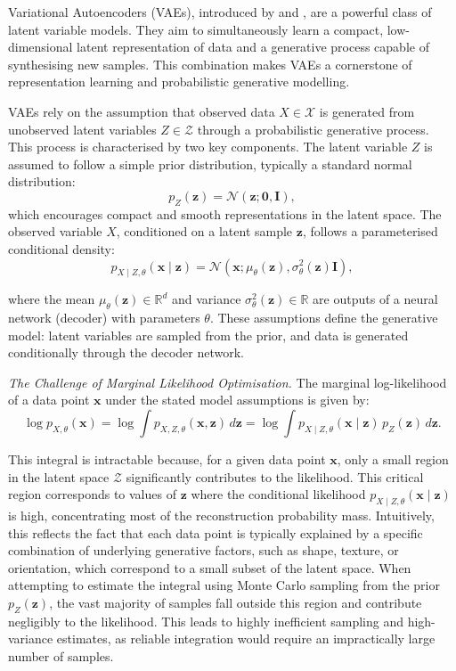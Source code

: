 Variational Autoencoders (VAEs), introduced by \citet{kingma2013auto} and \citet{rezende2014stochastic}, are a powerful class of latent variable models. They aim to simultaneously learn a compact, low-dimensional latent representation of data and a generative process capable of synthesising new samples. This combination makes VAEs a cornerstone of representation learning and probabilistic generative modelling.

VAEs rely on the assumption that observed data \(X \in \mathcal{X}\) is generated from unobserved latent variables \(Z \in \mathcal{Z}\) through a probabilistic generative process. This process is characterised by two key components. The latent variable \(Z\) is assumed to follow a simple prior distribution, typically a standard normal distribution:
\[
p_{Z}(\mathbf{z}) = \mathcal{N}(\mathbf{z}; \mathbf{0}, \mathbf{I}),
\]
which encourages compact and smooth representations in the latent space. The observed variable \(X\), conditioned on a latent sample \(\mathbf{z}\), follows a parameterised conditional density:
\begin{equation}
p_{X \mid Z, \theta}(\mathbf{x} \mid \mathbf{z}) = \mathcal{N}(\mathbf{x}; \mu_\theta(\mathbf{z}), \sigma_\theta^2(\mathbf{z}) \mathbf{I}),
\end{equation}\label{intro:eq:gaussian_reconstruction}

where the mean \(\mu_\theta(\mathbf{z}) \in \mathbb{R}^d\) and variance \(\sigma_\theta^2(\mathbf{z}) \in \mathbb{R}\) are outputs of a neural network (decoder) with parameters \(\theta\). These assumptions define the generative model: latent variables are sampled from the prior, and data is generated conditionally through the decoder network.

\textit{The Challenge of Marginal Likelihood Optimisation.}  
The marginal log-likelihood of a data point \(\mathbf{x}\) under the stated model assumptions is given by:
\[
\log p_{X, \theta}(\mathbf{x}) = \log \int p_{X, Z, \theta}(\mathbf{x}, \mathbf{z}) \, d\mathbf{z} = \log \int p_{X \mid Z, \theta}(\mathbf{x} \mid \mathbf{z}) \, p_{Z}(\mathbf{z}) \, d\mathbf{z}.
\]

This integral is intractable because, for a given data point \(\mathbf{x}\), only a small region in the latent space \(\mathcal{Z}\) significantly contributes to the likelihood. This critical region corresponds to values of \(\mathbf{z}\) where the conditional likelihood \(p_{X \mid Z, \theta}(\mathbf{x} \mid \mathbf{z})\) is high, concentrating most of the reconstruction probability mass. Intuitively, this reflects the fact that each data point is typically explained by a specific combination of underlying generative factors, such as shape, texture, or orientation, which correspond to a small subset of the latent space. When attempting to estimate the integral using Monte Carlo sampling from the prior \(p_Z(\mathbf{z})\), the vast majority of samples fall outside this region and contribute negligibly to the likelihood. This leads to highly inefficient sampling and high-variance estimates, as reliable integration would require an impractically large number of samples.

